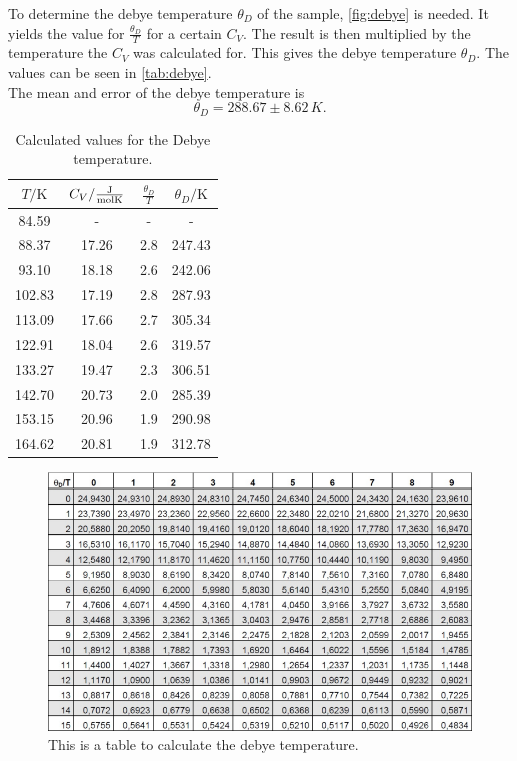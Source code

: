 To determine the debye temperature $\theta_D$ of the sample, \autoref{fig:debye} is needed. It yields the value for $\frac{\theta_D}{T}$ for a certain $C_V$.
The result is then multiplied by the temperature the $C_V$ was calculated for. This gives the debye temperature $\theta_D$. The values can be seen in \autoref{tab:debye}.\\
The mean and error of the debye temperature is 
\begin{equation}
    \theta_D = 288.67 \pm 8.62 \, K.
\end{equation}
\begin{table}[htbp] 
    \centering 
    \begin{tabular}{cccc} 
        \toprule $T/\unit{\kelvin}$ & $C_V / \unit{\frac{\joule}{\mol\kelvin}} $ & $\frac{\theta_D}{T}$ & $\theta_D/\unit{\kelvin} $\\ 
        \midrule 
        84.59  & -      & - &     -     \\   
        88.37  & 17.26 &  2.8  &  247.43        \\
        93.10  & 18.18  &  2.6 &  242.06    \\
        102.83 & 17.19  &  2.8 &  287.93  \\
        113.09 & 17.66  & 2.7  &  305.34 \\
        122.91 & 18.04 &  2.6  &  319.57   \\
        133.27 & 19.47  & 2.3  &  306.51   \\
        142.70 & 20.73  & 2.0  &  285.39   \\
        153.15 & 20.96  &  1.9 &  290.98    \\
        164.62 & 20.81 &   1.9 &  312.78 \\
                
        \bottomrule 
    \end{tabular} 
    \caption[Tabelle]{Calculated values for the Debye temperature.} 
    \label{tab:debye} 
\end{table}

\begin{figure}
    \centering
    \includegraphics[scale=0.6]{content/V47_pictures/debyetemp.PNG}
    \caption{This is a table to calculate the debye temperature.}
    \label{fig:debye}
  \end{figure}

